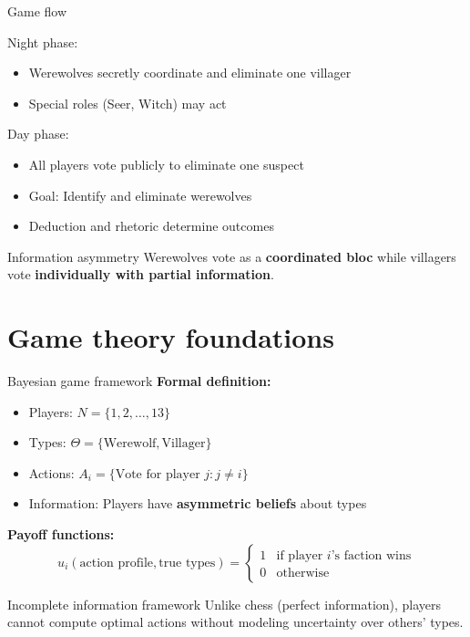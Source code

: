 \documentclass[10pt]{beamer}
\begin{document}
\begin{frame}{Game flow}

  Night phase:
    \begin{itemize}
      \item Werewolves secretly coordinate and eliminate one villager
      \item Special roles (Seer, Witch) may act
    \end{itemize}
    
  Day phase:
    \begin{itemize}
      \item All players vote publicly to eliminate one suspect
      \item Goal: Identify and eliminate werewolves
      \item Deduction and rhetoric determine outcomes
    \end{itemize}

  \vspace{0.5cm}
  \begin{exampleblock}{Information asymmetry}
    Werewolves vote as a \textbf{coordinated bloc} while villagers vote \textbf{individually with partial information}.
  \end{exampleblock}
\end{frame}

\section{Game theory foundations}

\begin{frame}{Bayesian game framework}
  \textbf{Formal definition:}
  \begin{itemize}
    \item Players: $N = \{1, 2, \ldots, 13\}$
    \item Types: $\Theta = \{\text{Werewolf}, \text{Villager}\}$
    \item Actions: $A_i = \{\text{Vote for player } j : j \neq i\}$
    \item Information: Players have \textbf{asymmetric beliefs} about types
  \end{itemize}

  \vspace{0.5cm}
  \textbf{Payoff functions:}
  $$u_i(\text{action profile}, \text{true types}) = \begin{cases}
    1 & \text{if player } i\text{'s faction wins} \\
    0 & \text{otherwise}
  \end{cases}$$

  \begin{alertblock}{Incomplete information framework}
    Unlike chess (perfect information), players cannot compute optimal actions without modeling uncertainty over others' types.
  \end{alertblock}
\end{frame}
\end{document}
